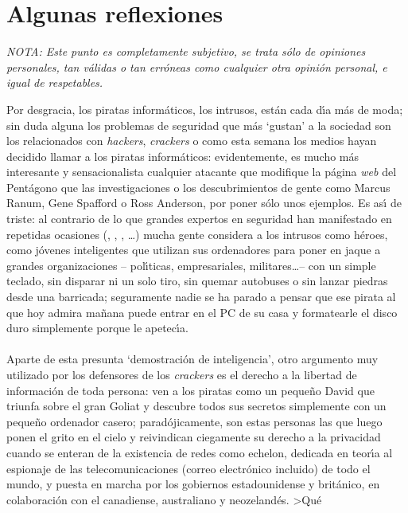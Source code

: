 \section{Algunas reflexiones}
\begin{center}
{\it NOTA: Este punto es completamente subjetivo, se trata s\'olo de opiniones 
personales, tan v\'alidas o tan err\'oneas como cualquier otra opini\'on 
personal, e igual de respetables.}
\end{center}
Por desgracia, los piratas inform\'aticos, los intrusos, est\'an cada d\'{\i}a 
m\'as de moda;
sin duda alguna los problemas de seguridad que m\'as `gustan' a la sociedad 
son los relacionados con {\it hackers}, {\it crackers} o como esta semana los 
medios hayan decidido llamar a los piratas inform\'aticos: evidentemente, es
mucho m\'as interesante y sensacionalista cualquier atacante que modifique la 
p\'agina {\it web} del Pent\'agono que las investigaciones o los 
descubrimientos de gente como Marcus Ranum, Gene Spafford o Ross Anderson, por 
poner s\'olo unos ejemplos. Es as\'{\i} de
triste: al contrario de lo que grandes expertos en seguridad han manifestado en 
repetidas ocasiones (\cite{kn:spa90}, \cite{kn:sto88}, \cite{kn:ran00}, 
\cite{kn:kru00}\ldots) 
mucha gente considera a los intrusos como h\'eroes, como j\'ovenes inteligentes 
que utilizan sus ordenadores para poner en jaque a grandes organizaciones -- 
pol\'{\i}ticas, empresariales, militares\ldots -- con un simple teclado, sin 
disparar ni un solo tiro, sin quemar autobuses o sin lanzar piedras 
desde una barricada; seguramente nadie se ha parado a pensar que ese pirata al
que hoy admira ma\~nana puede entrar en el PC de su casa y formatearle el disco 
duro simplemente porque le apetec\'{\i}a.\\ 
\\Aparte de esta presunta `demostraci\'on de inteligencia', otro argumento muy 
utilizado por los
defensores de los {\it crackers} es el derecho a la libertad de informaci\'on
de toda persona: ven a los piratas como un peque\~no David que triunfa sobre
el gran Goliat y descubre todos sus secretos simplemente con un peque\~no 
ordenador
casero; parad\'ojicamente, son estas personas las que luego ponen el grito en
el cielo y reivindican ciegamente su derecho a la privacidad cuando se enteran
de la existencia de redes como {\sc echelon}, dedicada en teor\'{\i}a al
espionaje de las telecomunicaciones (correo electr\'onico incluido) de todo el 
mundo, y puesta en marcha por los gobiernos estadounidense y brit\'anico, en
colaboraci\'on con el canadiense, australiano y neozeland\'es. >Qu\'e
